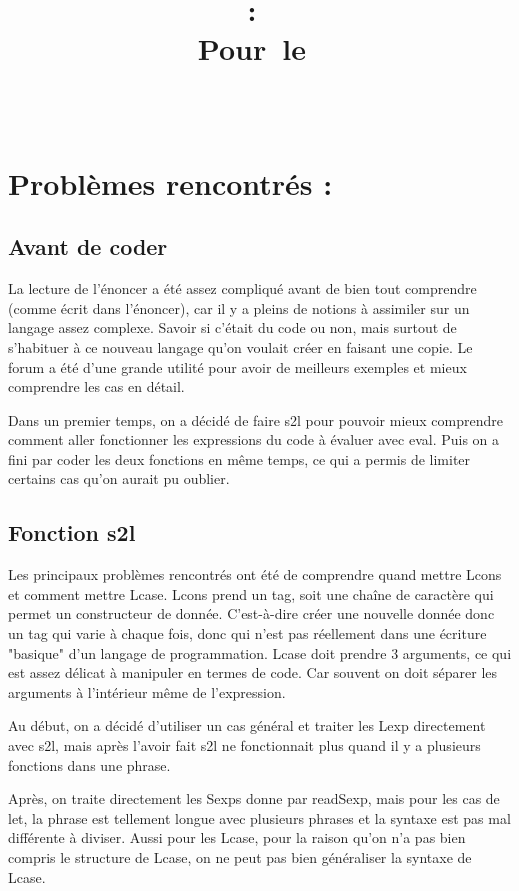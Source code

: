 \documentclass{article}
\title{
    \vspace{2in}
    \textmd{\textbf{\hmwkClass:\ \hmwkTitle}}\\
    \normalsize\vspace{0.1in}\small{Pour\ le\ \hmwkDueDate}\\
    \vspace{0.1in}\large{\textit{\hmwkClassInstructor\ \hmwkClassTime}}
    \vspace{3in}
}
\author{\hmwkAuthorName}
\date{}
\begin{document}
\maketitle
\newpage


\section{Problèmes rencontrés :}
\vspace{0.5cm}

\subsection{Avant de coder}


La lecture de l'énoncer a été assez compliqué avant de bien tout comprendre (comme écrit dans l'énoncer), car il y a pleins de notions à assimiler sur un langage assez complexe. Savoir si c'était du code ou non, mais surtout de s'habituer à ce nouveau langage qu'on voulait créer en faisant une copie. Le forum a été d'une grande utilité pour avoir de meilleurs exemples et mieux comprendre les cas en détail.

Dans un premier temps, on a décidé de faire s2l pour pouvoir mieux comprendre comment aller fonctionner les expressions du code à évaluer avec eval. Puis on a fini par coder les deux fonctions en même temps, ce qui a permis de limiter certains cas qu'on aurait pu oublier.

\subsection{Fonction s2l}


Les principaux problèmes rencontrés ont été de comprendre quand mettre Lcons et comment mettre Lcase. Lcons prend un tag, soit une chaîne de caractère qui permet un constructeur de donnée. C’est-à-dire créer une nouvelle donnée donc un tag qui varie à chaque fois, donc qui n'est pas réellement dans une écriture "basique" d'un langage de programmation. Lcase doit prendre 3 arguments, ce qui est assez délicat à manipuler en termes de code. Car souvent on doit séparer les arguments à l'intérieur même de l'expression.

Au début, on a décidé d’utiliser un cas général et traiter les Lexp directement avec s2l, mais après l'avoir fait s2l ne fonctionnait plus quand il y a plusieurs fonctions dans une phrase.

Après, on traite directement les Sexps donne par readSexp, mais pour les cas de let, la phrase est tellement longue avec plusieurs phrases et la syntaxe est pas mal différente à diviser. Aussi pour les Lcase, pour la raison qu’on n’a pas bien compris le structure de Lcase, on ne peut pas bien généraliser la syntaxe de Lcase.
\end{document}
